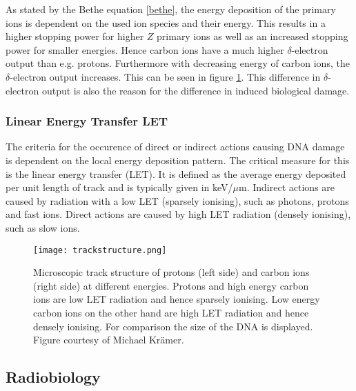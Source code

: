 \documentclass[type=dr, dr=rernat, accentcolor=tud7b,colorbacktitle, bigchapter, openright, twoside, 12pt ]{tudthesis}
\begin{document}
As stated by the Bethe equation \ref{bethe}, the energy deposition of the primary ions is dependent on the used ion species and their 
energy. This results in a higher stopping power for higher $Z$ primary ions as well as an increased stopping power for smaller energies. 
Hence carbon ions have a much higher $\delta$-electron output than e.g. protons. Furthermore with decreasing energy of 
carbon ions, the $\delta$-electron output increases. This can be seen in figure \ref{track}. This difference in $\delta$-electron output 
is also the reason for the difference in induced biological damage. 

\subsubsection{Linear Energy Transfer LET}

The criteria for the occurence of direct or indirect actions causing DNA damage is dependent on the local energy deposition pattern. 
The critical measure for this is the linear energy transfer (LET). It is defined as the average energy deposited per unit length of track 
\cite{Hal06} and is typically given in keV/$\mu$m. Indirect actions are caused by radiation with a low LET (sparsely ionising), 
such as photons, protons and fast ions. Direct actions are caused by high LET radiation (densely ionising), such as slow ions. 

\newpage

\vspace*{1cm}

\begin{figure}[H]
\begin{center}
\texttt{[image: trackstructure.png]}
\caption{Microscopic track structure of protons (left side) and carbon ions (right side) at different energies. Protons and high energy 
carbon ions are low LET radiation and hence sparsely ionising. Low energy carbon ions on the other hand are high LET radiation and hence 
densely ionising. For comparison the size of the DNA is displayed. Figure courtesy of Michael Kr\"amer.}
\label{track}
\end{center}
\end{figure}



\subsection{Radiobiology}
\end{document}
